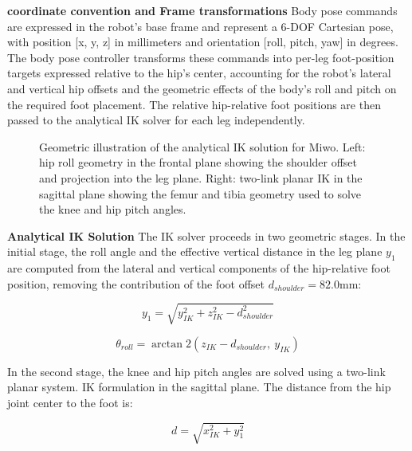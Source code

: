 \textbf{coordinate convention and Frame transformations}
Body pose commands are expressed in the robot's base frame and represent a 6-DOF Cartesian pose, with position [x, y, z] in millimeters and orientation [roll, pitch, yaw] in degrees. The body pose controller transforms these commands into per-leg foot-position targets expressed relative to the hip's center, accounting for the robot's lateral and vertical hip offsets and the geometric effects of the body's roll and pitch on the required foot placement. The relative hip-relative foot positions are then passed to the analytical IK solver for each leg independently. 
\begin{figure}[H]
    \centering
    \caption[Geometric illustration of the analytical IK 
    solution for Miwo]{Geometric illustration of the analytical IK 
    solution for Miwo. Left: hip roll geometry in the 
    frontal plane showing the shoulder offset and projection 
    into the leg plane. Right: two-link planar IK in the 
    sagittal plane showing the femur and tibia geometry 
    used to solve the knee and hip pitch angles.}
    \label{fig:ik_diagram}
\end{figure}

\textbf{Analytical IK Solution}
The IK solver proceeds in two geometric stages. In the initial stage, the roll angle and the effective vertical distance in the leg plane  $y_1$ are computed from the lateral and vertical components of the hip-relative foot position, removing the contribution of the foot offset $d_{shoulder} = 82.0$mm:

\begin{equation}
    y_1 = \sqrt{y_{IK}^2 + z_{IK}^2 - d_{shoulder}^2}
\end{equation}

\begin{equation}
    \theta_{roll} = \arctan2(z_{IK} - d_{shoulder},\ y_{IK})
\end{equation}

In the second stage, the knee and hip pitch angles are solved using a two-link planar system. IK formulation in the sagittal plane. The distance from the hip joint center to the foot is:

\begin{equation}
    d = \sqrt{x_{IK}^2 + y_1^2}
\end{equation}

